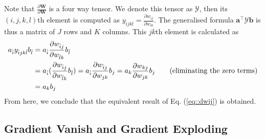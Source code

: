 \documentclass[a4paper, 12pt]{report}
\begin{document}
Note that $\frac{\partial {\textbf{W}}} {\partial {\textbf{W}}}$ is a four way tensor. 
We denote this tensor as $\mathcal{Y}$, then its $(i,j,k,l)$th element is computed as $y_{ijkl} = \frac{\partial {w_{ij}}}{\partial {w_{lk}}}$. 
The generalised formula $\bm{a}^{\top} \mathcal{Y}\bm{b} $ is thus a matrix of $J$ rows and $K$ columns. 
This $jk$th element is calculated as
\begin{align}
a_{\hat{i}} y_{\hat{i}jk\hat{l}} b_{\hat{l}} & = a_{\hat{i}} \frac{\partial {w_{\hat{i}j}}}{\partial {w_{\hat{l}k}}} b_{\hat{l}} \notag \\
& = a_{\hat{i}} (\frac{\partial {w_{\hat{i}j}}}{\partial {w_{\hat{l}k}}} b_{\hat{l}})  = a_{\hat{i}} \frac{\partial {w_{\hat{i}j}}}{\partial {w_{jk}}} b_{j} = a_{k} \frac{\partial {w_{kj}}}{\partial {w_{jk}}} b_{j} \tag{eliminating the zero terms} \\
& = a_{k}  b_{j}
\end{align}
From here, we conclude that  the  equivalent result of Eq. (\ref{eq::dwij})  is obtained.

\subsection{Gradient Vanish and Gradient Exploding}





\end{document}
